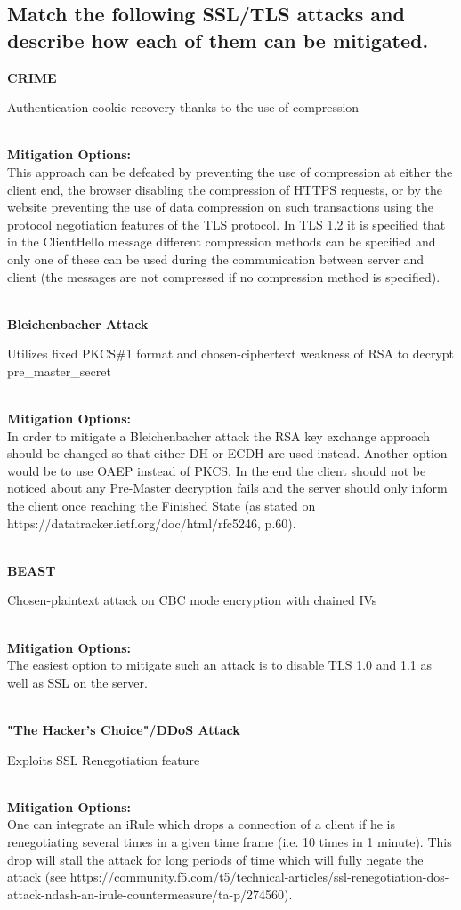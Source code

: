 \documentclass{report}
\begin{document}
		\subsection{Match the following SSL/TLS attacks and describe how each of them can be mitigated.}
		\startsubsection
			\parbox{6.5cm}{\textbf{CRIME}\dotfill} \parbox[t]{8cm}{Authentication cookie recovery thanks to the use of compression} \\
			\textbf{Mitigation Options:} \\
			This approach can be defeated by preventing the use of compression at either the client end, the browser disabling the compression of HTTPS requests, or by the website preventing the use of data compression on such transactions using the protocol negotiation features of the TLS protocol. In TLS 1.2 it is specified that in the ClientHello message different compression methods can be specified and only one of these can be used during the communication between server and client (the messages are not compressed if no compression method is specified).\\
			\\\parbox{6.5cm}{\textbf{Bleichenbacher Attack}\dotfill} \parbox[t]{8cm}{Utilizes fixed PKCS\#1 format and chosen-ciphertext weakness of RSA to decrypt pre\_master\_secret} \\
			\textbf{Mitigation Options:} \\
			In order to mitigate a Bleichenbacher attack the RSA key exchange approach should be changed so that either DH or ECDH are used instead. Another option would be to use OAEP instead of PKCS. In the end the client should not be noticed about any Pre-Master decryption fails and the server should only inform the client once reaching the Finished State (as stated on https://datatracker.ietf.org/doc/html/rfc5246, p.60). \\
			\\\parbox{6.5cm}{\textbf{BEAST}\dotfill} \parbox[t]{8cm}{Chosen-plaintext attack on CBC mode encryption with chained IVs} \\
			\textbf{Mitigation Options:} \\
			The easiest option to mitigate such an attack is to disable TLS 1.0 and 1.1 as well as SSL on the server. \\
			\\\parbox{6.5cm}{\textbf{"The Hacker's Choice"/DDoS Attack}\dotfill} \parbox[t]{8cm}{Exploits SSL Renegotiation feature} \\
			\textbf{Mitigation Options:} \\
			One can integrate an iRule which drops a connection of a client if he is renegotiating several times in a given time frame (i.e. 10 times in 1 minute). This drop will stall the attack for long periods of time which will fully negate the attack (see https://community.f5.com/t5/technical-articles/ssl-renegotiation-dos-attack-ndash-an-irule-countermeasure/ta-p/274560).
		\closesection
	\closesection
\end{document}
